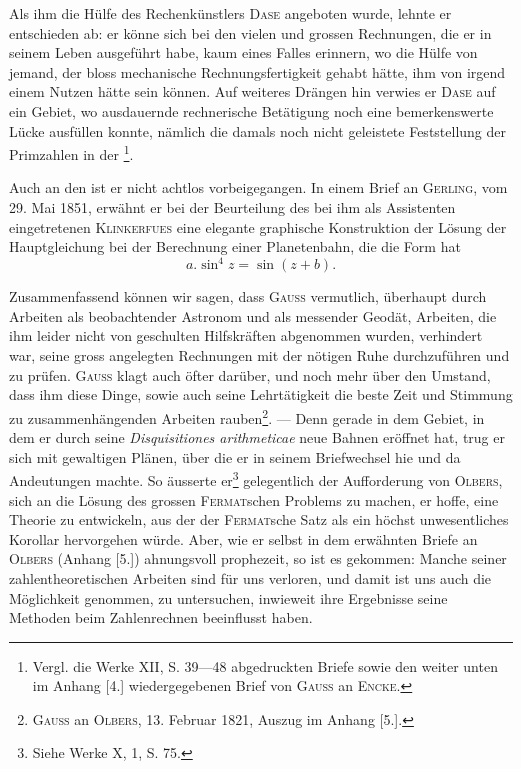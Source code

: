 Als ihm die Hülfe des Rechenkünstlers \textsc{Dase} angeboten wurde, lehnte
er entschieden ab: er könne sich bei den vielen und grossen Rechnungen,
die er in seinem Leben ausgeführt habe, kaum eines Falles erinnern, wo die
Hülfe von jemand, der bloss mechanische Rechnungsfertigkeit gehabt hätte,
ihm von irgend einem Nutzen hätte sein können. Auf weiteres Drängen hin
verwies er \textsc{Dase} auf ein Gebiet, wo ausdauernde rechnerische Betätigung noch
eine bemerkenswerte Lücke ausfüllen konnte, nämlich die damals noch nicht
geleistete Feststellung der Primzahlen in der \footnote{Vergl. die Werke XII, S. 39—48 abgedruckten Briefe sowie den weiter unten im Anhang [4.]
wiedergegebenen Brief von \textsc{Gauss} an \textsc{Encke}.}.

Auch an den  ist er nicht achtlos vorbeigegangen. In einem Brief an \textsc{Gerling}, vom 29. Mai 1851, erwähnt er bei
der Beurteilung des bei ihm als Assistenten eingetretenen \textsc{Klinkerfues} eine
elegante graphische Konstruktion der Lösung der Hauptgleichung bei der Berechnung einer Planetenbahn, die die Form hat
\[
a\mathord{.}\sin^4 z=\sin(z+b).
\]

Zusammenfassend können wir sagen, dass \textsc{Gauss} vermutlich, überhaupt
durch Arbeiten als beobachtender Astronom und als messender Geodät, Arbeiten, die ihm leider nicht von geschulten Hilfskräften abgenommen wurden,
verhindert war, seine gross angelegten Rechnungen mit der nötigen Ruhe
durchzuführen und zu prüfen. \textsc{Gauss} klagt auch öfter darüber, und noch
mehr über den Umstand, dass ihm diese Dinge, sowie auch seine Lehrtätigkeit die beste Zeit und Stimmung zu zusammenhängenden Arbeiten rauben\footnote{\textsc{Gauss} an \textsc{Olbers}, 13. Februar 1821, Auszug im Anhang [5.].}.
— Denn gerade in dem Gebiet, in dem er durch seine \textit{Disquisitiones arithmeticae} neue Bahnen eröffnet hat, trug er sich mit gewaltigen Plänen, über
die er in seinem Briefwechsel hie und da Andeutungen machte. So äusserte
er\footnote{Siehe Werke X, 1, S. 75.} gelegentlich der Aufforderung von \textsc{Olbers}, sich an die Lösung des grossen
\textsc{Fermat}schen Problems zu machen, er hoffe, eine Theorie zu entwickeln, aus
\clearpage{}
\setcounter{footnote}{0}
\noindent der der \textsc{Fermat}sche Satz als ein höchst unwesentliches Korollar hervorgehen
würde. Aber, wie er selbst in dem erwähnten Briefe an \textsc{Olbers} (Anhang [5.])
ahnungsvoll prophezeit, so ist es gekommen: Manche seiner zahlentheoretischen
Arbeiten sind für uns verloren, und damit ist uns auch die Möglichkeit genommen, zu untersuchen, inwieweit ihre Ergebnisse seine Methoden beim Zahlenrechnen beeinflusst haben.

